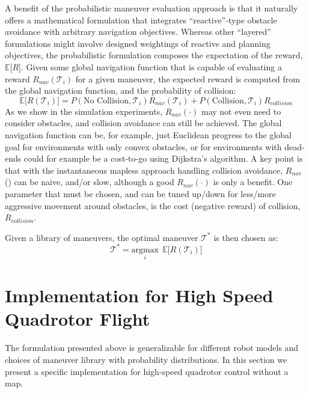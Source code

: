 \documentclass{llncs}
\begin{document}
A benefit of the probabilistic maneuver evaluation approach is that it naturally offers a mathematical formulation that integrates ``reactive''-type obstacle avoidance with arbitrary navigation objectives.  Whereas other ``layered''  formulations might involve designed weightings of reactive and planning objectives, the probabilistic formulation composes the expectation of the reward, $\mathbb{E} \big[ R \big]$.  Given some global navigation function that is capable of evaluating a reward $R_{nav}(\mathcal{T}_i)$ for a given maneuver, the expected reward is computed from the global navigation function, and the probability of collision:
%
\begin{equation}
\mathbb{E} \big[ R(\mathcal{T}_i) \big] = P(\text{No Collision}, \mathcal{T}_i)R_{nav}(\mathcal{T}_i) + P(\text{Collision}, \mathcal{T}_i)R_{collision}
\end{equation}
%
As we show in the simulation experiments, $R_{nav}(\cdot)$ may not even need to consider obstacles, and collision avoidance can still be achieved. The global navigation function can be, for example, just Euclidean progress to the global goal for environments with only convex obstacles, or for environments with dead-ends could for example be a cost-to-go using Dijkstra's algorithm.  A key point is that with the instantaneous mapless approach handling collision avoidance, $R_{nav}$() can be naive, and/or slow, although a good $R_{nav}(\cdot)$ is only a benefit.  One parameter that must be chosen, and can be tuned up/down for less/more aggressive movement around obstacles, is the cost (negative reward) of collision, $R_{collision}$.

Given a library of maneuvers, the optimal maneuver $\mathcal{T}^*$ is then chosen as:
%
\begin{equation}
\mathcal{T}^* = \underset{i}{\text{argmax}} \ \   \mathbb{E} \big[ R(\mathcal{T}_i)  \big]
\end{equation}

\section{Implementation for High Speed Quadrotor Flight}

The formulation presented above is generalizable for different robot models and choices of maneuver library with probability distributions.  In this section we present a specific implementation for high-speed quadrotor control without a map. %
\end{document}
